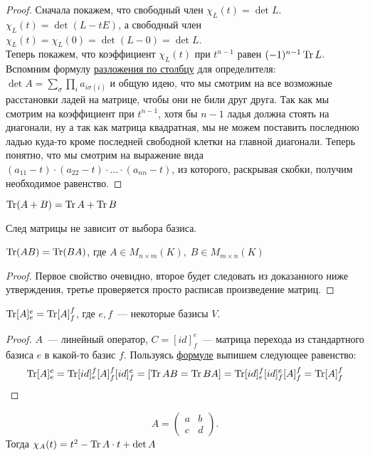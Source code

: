 \begin{proof} 
    Сначала покажем, что свободный член $\chi_L(t) = \det L$. \\ $\chi_L(t) = \det (L - t E)$,
    а свободный член $\chi_L(t) = \chi_L(0) = \det (L - 0) = \det L$. \\
    Теперь покажем, что коэффициент $\chi_L(t)$ при $t^{n - 1}$ равен $(-1)^{n - 1} \operatorname{Tr} L$. \\
    Вспомним формулу \hyperref[stm:Формула разложения]{разложения по столбцу} для определителя:
    $\det A = \sum\limits_\sigma \prod\limits_i a_{i\sigma(i)}$ и общую идею,
    что мы смотрим на все возможные расстановки ладей на матрице, чтобы они не били друг друга.
    Так как мы смотрим на коэффициент при $t^{n - 1}$, хотя бы $n - 1$ ладья должна стоять на диагонали,
    ну а так как матрица квадратная, мы не можем поставить последнюю ладью куда-то кроме последней свободной клетки на главной диагонали.
    Теперь понятно, что мы смотрим на выражение вида 
    $(a_{1 1} - t)\cdot(a_{2 2} - t)\cdot \dots \cdot (a_{n n} - t)$,
    из которого, раскрывая скобки, получим необходимое равенство.
\end{proof}
\begin{properties}
    \item $\operatorname{Tr} (A + B) = \operatorname{Tr} A + \operatorname{Tr} B$
    \item След матрицы не зависит от выбора базиса.
    \item $\operatorname{Tr} (AB) = \operatorname{Tr} (BA)$, где $A \in M_{n \times m}(K), \; B \in M_{m \times n}(K)$
\end{properties}
\begin{proof}
    Первое свойство очевидно, второе будет следовать из доказанного ниже утверждения,
    третье проверяется просто расписав произведение матриц.
\end{proof}
\begin{statement}
    $\operatorname{Tr} [A]^e_e = \operatorname{Tr} [A]^f_f$, где $e,f$~--- некоторые базисы $V$.
\end{statement}
\begin{proof}
    $A$~--- линейный оператор, $C = [id]^e_f$~--- матрица перехода из стандартного базиса $e$ в какой-то базис $f$.
    Пользуясь \hyperref[]{формуле} выпишем следующее равенство:
    \[
        \operatorname{Tr} [A]^e_e = 
        \operatorname{Tr} [id]^f_e [A]^f_f [id]^e_f = 
        [\operatorname{Tr} AB = \operatorname{Tr} BA] =
        \operatorname{Tr} [id]^f_e [id]^e_f [A]^f_f = 
        \operatorname{Tr} [A]^f_f
    \] 
\end{proof}
\begin{example}
    \[
    A = 
    \begin{pmatrix}
        a&b\\
        c&d
    \end{pmatrix}
    .\] 
    Тогда $\chi_A(t) = t^2 - \operatorname{Tr} A\cdot t + \det A$
\end{example}
